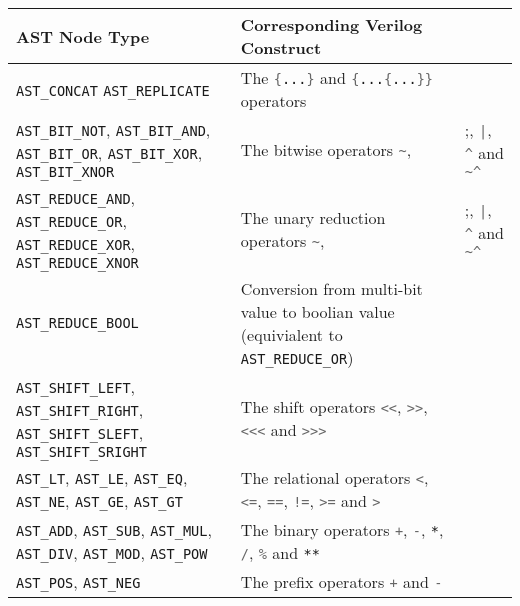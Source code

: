 \begin{table}[t!]
\ContinuedFloat
\hfil
\begin{tabular}{>{\raggedright\arraybackslash}p{7cm}>{\raggedright\arraybackslash}p{8cm}}
AST Node Type & Corresponding Verilog Construct \\
\hline
\hline
{}
{\tt AST\_CONCAT}
{\tt AST\_REPLICATE} &
The \lstinline[language=Verilog];{...}; and
\lstinline[language=Verilog];{...{...}}; operators \\
\hline
%
{\tt AST\_BIT\_NOT},
{\tt AST\_BIT\_AND},
{\tt AST\_BIT\_OR},
{\tt AST\_BIT\_XOR},
{\tt AST\_BIT\_XNOR} &
The bitwise operators \break
\lstinline[language=Verilog];~;,
\lstinline[language=Verilog];&;,
\lstinline[language=Verilog];|;,
\lstinline[language=Verilog];^; and
\lstinline[language=Verilog];~^; \\
\hline
%
{\tt AST\_REDUCE\_AND},
{\tt AST\_REDUCE\_OR},
{\tt AST\_REDUCE\_XOR},
{\tt AST\_REDUCE\_XNOR} &
The unary reduction operators \break
\lstinline[language=Verilog];~;,
\lstinline[language=Verilog];&;,
\lstinline[language=Verilog];|;,
\lstinline[language=Verilog];^; and
\lstinline[language=Verilog];~^; \\
\hline
%
{\tt AST\_REDUCE\_BOOL} &
Conversion from multi-bit value to boolian value
(equivialent to {\tt AST\_REDUCE\_OR}) \\
\hline
%
{\tt AST\_SHIFT\_LEFT},
{\tt AST\_SHIFT\_RIGHT},
{\tt AST\_SHIFT\_SLEFT},
{\tt AST\_SHIFT\_SRIGHT} &
The shift operators \break
\lstinline[language=Verilog];<<;,
\lstinline[language=Verilog];>>;,
\lstinline[language=Verilog];<<<; and
\lstinline[language=Verilog];>>>; \\
\hline
%
{\tt AST\_LT},
{\tt AST\_LE},
{\tt AST\_EQ},
{\tt AST\_NE},
{\tt AST\_GE},
{\tt AST\_GT} &
The relational operators \break
\lstinline[language=Verilog];<;,
\lstinline[language=Verilog];<=;,
\lstinline[language=Verilog];==;,
\lstinline[language=Verilog];!=;,
\lstinline[language=Verilog];>=; and
\lstinline[language=Verilog];>; \\
\hline
%
{\tt AST\_ADD},
{\tt AST\_SUB},
{\tt AST\_MUL},
{\tt AST\_DIV},
{\tt AST\_MOD},
{\tt AST\_POW} &
The binary operators \break
\lstinline[language=Verilog];+;,
\lstinline[language=Verilog];-;,
\lstinline[language=Verilog];*;,
\lstinline[language=Verilog];/;,
\lstinline[language=Verilog];%; and
\lstinline[language=Verilog];**; \\
\hline
%
{\tt AST\_POS},
{\tt AST\_NEG} &
The prefix operators
\lstinline[language=Verilog];+; and
\lstinline[language=Verilog];-; \\

\end{tabular}
\end{table}
